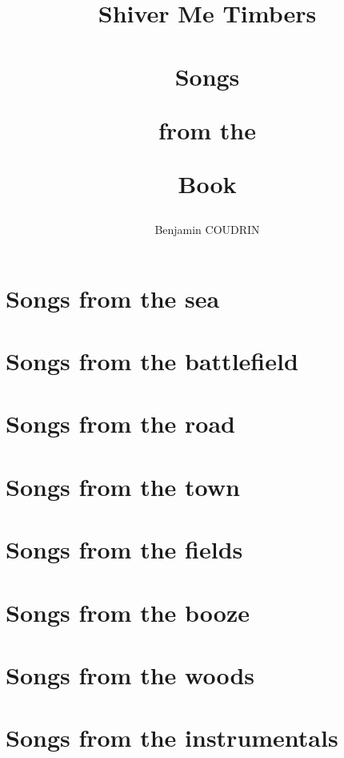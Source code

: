 \documentclass[a4paper,10pt]{book}
\begin{document}
\title{\Large\bf Shiver Me Timbers \\ ~\\ Songs \begin{tiny}from the\end{tiny} Book}
\author{Benjamin COUDRIN}
\maketitle

\makeTitleContents

\chapter{Songs from the sea}
	

\chapter{Songs from the battlefield}
	
	
\chapter{Songs from the road}
	

\chapter{Songs from the town}
	

\chapter{Songs from the fields}
	
	
\chapter{Songs from the booze}
	
	
\chapter{Songs from the woods}
	

\chapter{Songs from the instrumentals}
	
\end{document}
